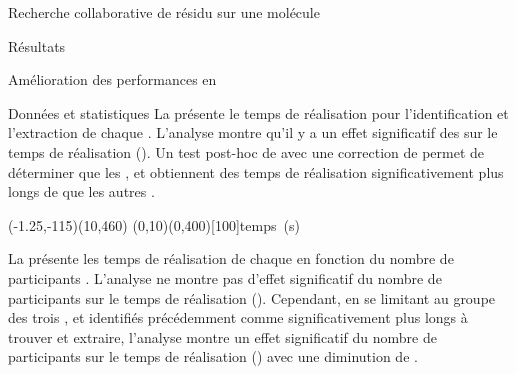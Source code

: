 \documentclass[myfrancais,ngerman,english,frenchb]{mythesis}
\begin{document}
\begin{mychapter}{Recherche collaborative de résidu sur une molécule}
\begin{mysection}{Résultats}
\begin{mysubsection}{Amélioration des performances en }
\begin{mysubsubsection}{Données et statistiques}
					La  présente le temps de réalisation  pour l'identification et l'extraction de chaque  .
					L'analyse montre qu'il y a un effet significatif des   sur le temps de réalisation  ().
					Un test post-hoc de  avec une correction de  permet de déterminer que les  ,  et  obtiennent des temps de réalisation significativement plus longs de  que les autres .

					\begin{myfigure}
						\begin{myps}(-1.25,-115)(10,460)
							\myaxes(0,10){}(0,400)[100]{temps~(s)}
						\end{myps}
					\end{myfigure}

					La  présente les temps de réalisation  de chaque   en fonction du nombre de participants .
					L'analyse ne montre pas d'effet significatif du nombre de participants  sur le temps de réalisation  ().
					Cependant, en se limitant au groupe des trois  ,  et  identifiés précédemment comme significativement plus longs à trouver et extraire, l'analyse montre un effet significatif du nombre de participants  sur le temps de réalisation  () avec une diminution de .


\end{mysubsubsection}
\end{mysubsection}
\end{mysection}
\end{mychapter}
\end{document}
